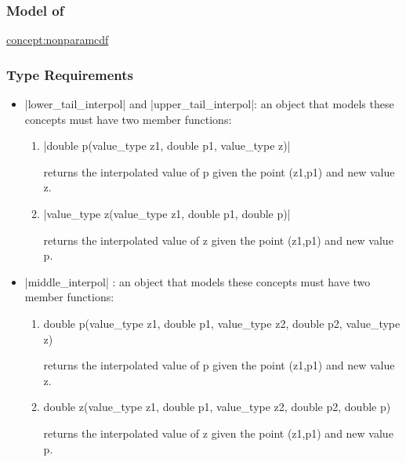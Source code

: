 \documentclass[12pt,twoside]{report}
\begin{document}
\htmlrule[CLEAR=all]  \subsubsection*{Model of}
\hyperref{Non-Parametric Cdf}{Non-Parametric Cdf (see Section}{)}{concept:nonparamcdf}

\htmlrule[CLEAR=all]  \subsubsection*{Type Requirements}
\begin{itemize}
\item |lower_tail_interpol| and |upper_tail_interpol|: an object that models these concepts must have two member functions:
  \begin{enumerate}
  \item |double p(value_type z1, double p1, value_type z)|

    returns the interpolated value of p given the point (z1,p1) and new value z.

  \item |value_type z(value_type z1, double p1, double p)|
    
    returns the interpolated value of z given the point (z1,p1) and new value p.

  \end{enumerate}
 

\item |middle_interpol| : an object that models these concepts must have two member functions:
  \begin{enumerate}
  \item
    \begin{code}
      double p(value_type z1, double p1, 
               value_type z2, double p2, value_type z)
    \end{code}

    returns the interpolated value of p given the point (z1,p1) and new value z.

  \item
    \begin{code}
      double z(value_type z1, double p1, 
               value_type z2, double p2, double p)
    \end{code}

    returns the interpolated value of z given the point (z1,p1) and new value p.

  \end{enumerate}
 
\end{itemize}
\end{document}
